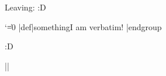 \documentclass{article}
\begin{document}
\begin{scontents}[store-env=another]
Leaving:
\aftergroup\stop :D
\end{scontents}

\begin{scontents}[store-env=test]
\begingroup
  \catcode`\|=0
  |def|something{I am verbatim!}
|endgroup
\something
\end{scontents}

\begin{scontents}[store-env=test]
\hello :D
\end{scontents}

\Scontents*{\abcde}
\Scontents*|\fghij|





\end{document}
